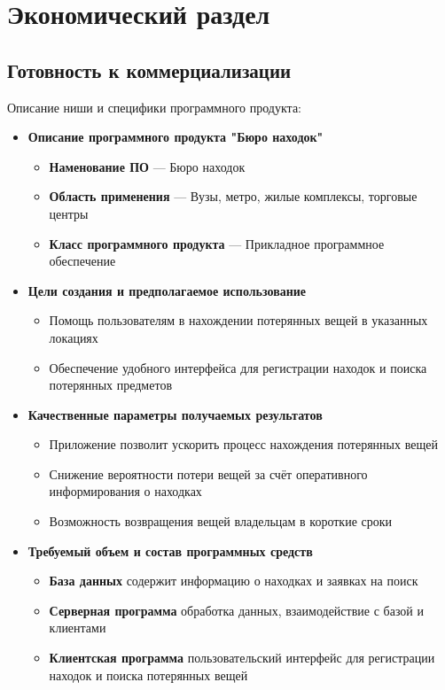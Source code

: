 \section{Экономический раздел}
\label{sec:economy}

\subsection{Готовность к коммерциализации}

Описание ниши и специфики программного продукта:
\begin{itemize}
	\item \textbf{Описание программного продукта "Бюро находок"}
	\begin{itemize}
		\item \textbf{Наменование ПО} --- Бюро находок
		\item \textbf{Область применения} --- Вузы, метро, жилые комплексы, торговые центры
		\item \textbf{Класс программного продукта} --- Прикладное программное обеспечение
	\end{itemize}
	
	\item \textbf{Цели создания и предполагаемое использование}
	\begin{itemize}
		\item Помощь пользователям в нахождении потерянных вещей в указанных локациях
		\item Обеспечение удобного интерфейса для регистрации находок и поиска потерянных предметов
	\end{itemize}
	
	\item \textbf{Качественные параметры получаемых результатов}
	\begin{itemize}
		\item Приложение позволит ускорить процесс нахождения потерянных вещей
		\item Снижение вероятности потери вещей за счёт оперативного информирования о находках
		\item Возможность возвращения вещей владельцам в короткие сроки
	\end{itemize}
	
	\item \textbf{Требуемый объем и состав программных средств}
	\begin{itemize}
		\item \textbf{База данных} содержит информацию о находках и заявках на поиск
		\item \textbf{Серверная программа} обработка данных, взаимодействие с базой и клиентами
		\item \textbf{Клиентская программа} пользовательский интерфейс для регистрации находок и поиска потерянных вещей
	\end{itemize}
	

\end{itemize}
